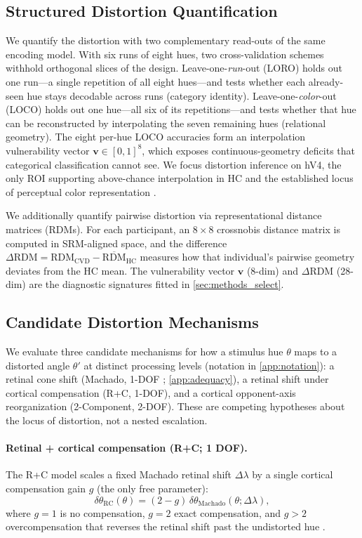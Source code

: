 \documentclass{article}
\begin{document}
\subsection{Structured Distortion Quantification}

We quantify the distortion with two complementary read-outs of the same encoding model.
With six runs of eight hues, two cross-validation schemes withhold orthogonal slices of the design.
Leave-one-\emph{run}-out (LORO) holds out one run---a single repetition of all eight hues---and tests whether each already-seen hue stays decodable across runs (category identity).
Leave-one-\emph{color}-out (LOCO) holds out one hue---all six of its repetitions---and tests whether that hue can be reconstructed by interpolating the seven remaining hues (relational geometry).
The eight per-hue LOCO accuracies form an interpolation vulnerability vector $\mathbf{v} \in [0,1]^8$, which exposes continuous-geometry deficits that categorical classification cannot see.
We focus distortion inference on hV4, the only ROI supporting above-chance interpolation in HC and the established locus of perceptual color representation \citep{brouwer2009, bannert2018}.

We additionally quantify pairwise distortion via representational distance matrices (RDMs).
For each participant, an $8 \times 8$ crossnobis distance matrix is computed in SRM-aligned space, and the difference $\Delta\text{RDM} = \text{RDM}_{\text{CVD}} - \overline{\text{RDM}}_{\text{HC}}$ measures how that individual's pairwise geometry deviates from the HC mean.
The vulnerability vector $\mathbf{v}$ (8-dim) and $\Delta$RDM (28-dim) are the diagnostic signatures fitted in \cref{sec:methods_select}.

\subsection{Candidate Distortion Mechanisms}

We evaluate three candidate mechanisms for how a stimulus hue $\theta$ maps to a distorted angle $\theta'$ at distinct processing levels (notation in \cref{app:notation}): a retinal cone shift (Machado, 1-DOF \citep{machado2009}; \cref{app:adequacy}), a retinal shift under cortical compensation (R+C, 1-DOF), and a cortical opponent-axis reorganization (2-Component, 2-DOF).
These are competing hypotheses about the locus of distortion, not a nested escalation.

\paragraph{Retinal + cortical compensation (R+C; 1 DOF).}
The R+C model scales a fixed Machado retinal shift $\Delta\lambda$ by a single cortical compensation gain $g$ (the only free parameter):
\begin{equation}
\delta\theta_{\text{RC}}(\theta) = (2 - g)\, \delta\theta_{\text{Machado}}(\theta; \Delta\lambda),
\label{eq:rc}
\end{equation}
where $g{=}1$ is no compensation, $g{=}2$ exact compensation, and $g{>}2$ overcompensation that reverses the retinal shift past the undistorted hue \citep{tregillus2021}.
\end{document}
